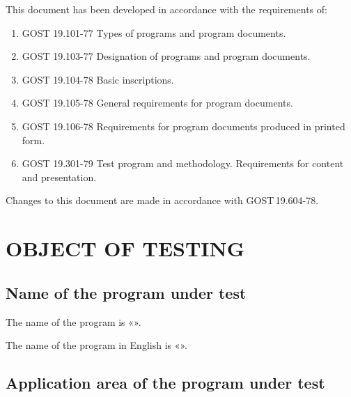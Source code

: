 \documentclass[12pt,a4paper]{extarticle}
\begin{document}
\noindent
This document has been developed in accordance with the requirements of:

\begin{enumerate}[label=\arabic*), leftmargin=1.25cm]
\item GOST 19.101-77 Types of programs and program documents\cite{gost19101}.
\item GOST 19.103-77 Designation of programs and program documents\cite{gost19103}.
\item GOST 19.104-78 Basic inscriptions\cite{gost19104}.
\item GOST 19.105-78 General requirements for program documents\cite{gost19105}.
\item GOST 19.106-78 Requirements for program documents produced in
      printed form\cite{gost19106}.
\item GOST 19.301-79 Test program and methodology. Requirements for
      content and presentation\cite{gost19301}.
\end{enumerate}

Changes to this document are made in accordance with GOST\,19.604-78\cite{gost19604}.

\clearpage

\hypersetup{linkcolor=black}
\tableofcontents
\hypersetup{linkcolor=blue}
\thispagestyle{fancy}
\clearpage

\section{OBJECT OF TESTING}

\subsection{Name of the program under test}

The name of the program is «\projectname».

The name of the program in English is «\hseProjectNameEn».

\subsection{Application area of the program under test}
\end{document}
